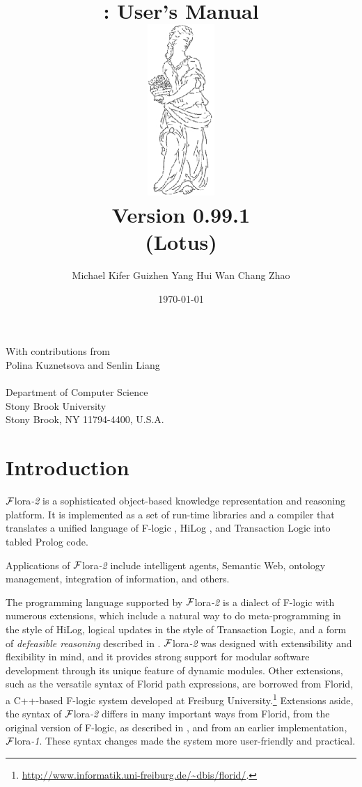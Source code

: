 \documentclass[11pt]{article}
\title{
        \FLORA: User's Manual
        \vspace{0.7cm}\\
 \includegraphics[width=1in]{floralogo} 
           \vspace{3mm}\\
       {\Large Version 0.99.1}
       \\
       {\large (Lotus)}
       }
\author{
  Michael Kifer
  \hspace{1cm}
  Guizhen Yang
  \hspace{1cm}
  Hui Wan
  \hspace{1cm}
  Chang Zhao
  }
\newcommand{\FLORA}{{\mbox{\sc ${\cal F}${lora}\rm\emph{-2}}}\xspace}
\newcommand{\FLORAone}{{\mbox{${\cal F}${\sc lora}\emph{-1}}}\xspace}
\newcommand{\FLORID}{{\mbox{\sc Florid}}\xspace}
\newcommand{\fl}{\mbox{F-logic}\xspace}
\begin{document}
\date{}
\maketitle

\begin{center}
  \large
 With contributions from \\
 \large
 Polina Kuznetsova and Senlin Liang
  \\~\\
  Department of Computer Science\\
  Stony Brook University\\
  Stony Brook, NY 11794-4400, U.S.A.
 \vspace{1.4cm}\\
\date{\today}
\end{center}

\thispagestyle{empty}

\newpage
{}
\setcounter{page}{1}

\tableofcontents

\newpage

\setcounter{page}{1}


\section{Introduction}\label{sec-intro}

\FLORA is a sophisticated object-based  knowledge representation and
reasoning platform. It is implemented as a set of run-time
libraries and a compiler that translates a unified language of \fl
\cite{KLW95}, HiLog \cite{hilog-jlp}, and Transaction Logic
\cite{trans-chapter-98,trans-tcs94} into tabled Prolog code.

Applications of \FLORA include intelligent agents, Semantic Web, ontology
management, integration of information, and others. 

The programming language supported by \FLORA is a dialect of \fl with
numerous extensions, which include a natural way to do meta-programming in
the style of HiLog, logical updates in the style of Transaction
Logic, and a form of \emph{defeasible reasoning} described in
\cite{lpda-iclp-09}. \FLORA was designed with extensibility and flexibility in mind, and
it provides strong support for modular software development through its unique
feature of dynamic modules.
Other extensions, such as the versatile syntax of \FLORID path
expressions, are borrowed from
\FLORID, a C++-based \fl system developed at
Freiburg University.\footnote{
  \url{http://www.informatik.uni-freiburg.de/~dbis/florid/}.
}
Extensions aside, the syntax of \FLORA differs in many
important ways from \FLORID, from the original version of \fl, as described
in \cite{KLW95}, and from an earlier implementation, \FLORAone. These
syntax changes made the system more user-friendly and practical.
\end{document}

